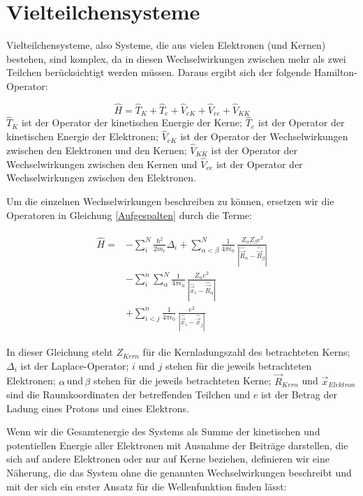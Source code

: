 \section{Vielteilchensysteme}
Vielteilchensysteme, also Systeme, die aus vielen Elektronen (und Kernen) bestehen, sind komplex, da in diesen Wechselwirkungen zwischen mehr als zwei Teilchen berücksichtigt werden müssen. Daraus ergibt sich der folgende Hamilton-Operator:

\begin{equation}
\label{Aufgespalten}
\hat{H} = \hat{T}_{K} + \hat{T}_{e} + \hat{V}_{eK} + \hat{V}_{ee} + \hat{V}_{KK}
\end{equation}
$\hat{T}_{K}$ ist der Operator der kinetischen Energie der Kerne;
$\hat{T}_{e}$ ist der Operator der kinetischen Energie der Elektronen;
$\hat{V}_{eK}$ ist der Operator der Wechselwirkungen zwischen den Elektronen und den Kernen;
$\hat{V}_{KK}$ ist der Operator der Wechselwirkungen zwischen den Kernen
und $\hat{V}_{ee}$ ist der Operator der Wechselwirkungen zwischen den Elektronen.

Um die einzelnen Wechselwirkungen beschreiben zu können, ersetzen wir die Operatoren in Gleichung \ref{Aufgespalten} durch die Terme:

\begin{align}
\begin{split}
\hat{H} =& -\sum^{N}_{i} \frac{\hbar^2}{2m_e} \Delta_{i} + \sum^{N}_{\alpha<\beta}\frac{1}{4\pi \epsilon_0}\,\frac{Z_\alpha Z_\beta e^2}{|\hat{\vec{R}}_\alpha-\hat{\vec{R}}_\beta|}\\
& - \sum^{n}_{i}\sum^{N}_{\alpha}\frac{1}{4\pi \epsilon_0}\,\frac{Z_\alpha e^2}{|\hat{\vec{x}}_i-\hat{\vec{R}}_\alpha|}\\
& + \sum^{n}_{i<j} \frac{1}{4\pi\epsilon_0}\,\frac{e^2}{|\hat{\vec{x}}_i-\hat{\vec{x}}_j|}
\end{split}
\end{align}

In dieser Gleichung steht $Z_{Kern}$ für die Kernladungszahl des betrachteten Kerns; $\Delta_i$ ist der Laplace-Operator; $i$ und $j$ stehen für die jeweils betrachteten Elektronen; $\alpha\,$und$\,\beta$ stehen für die jeweils betrachteten Kerne; $\vec{R}_{Kern}$ und $\vec{x}_{Elektron}$ sind die Raumkoordinaten der betreffenden Teilchen und $e$ ist der Betrag der Ladung eines Protons und eines Elektrons.

Wenn wir die Gesamtenergie des Systems als Summe der kinetischen und potentiellen Energie aller Elektronen mit Ausnahme der Beiträge darstellen, die sich auf andere Elektronen oder nur auf Kerne beziehen, definieren wir eine Näherung, die das System ohne die genannten Wechselwirkungen beschreibt und mit der sich ein erster Ansatz für die Wellenfunktion finden lässt:

